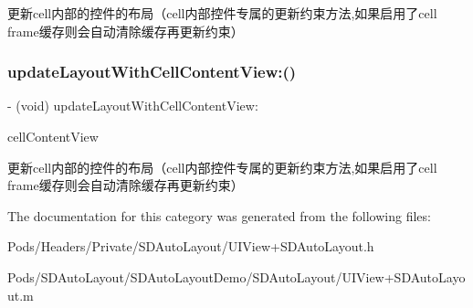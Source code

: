 更新cell内部的控件的布局（cell内部控件专属的更新约束方法,如果启用了cell frame缓存则会自动清除缓存再更新约束） \mbox{\label{category_u_i_view_07_s_d_auto_height_width_08_ad0e71cc33b6b6cb7ad65236d0a8e5df9}} 
\subsubsection{\texorpdfstring{update\+Layout\+With\+Cell\+Content\+View\+:()}{updateLayoutWithCellContentView:()}\hspace{0.1cm}{\footnotesize\ttfamily [3/3]}}
{\footnotesize\ttfamily -\/ (void) update\+Layout\+With\+Cell\+Content\+View\+: \begin{DoxyParamCaption}\item[{(U\+I\+View $\ast$)}]{cell\+Content\+View }\end{DoxyParamCaption}}

更新cell内部的控件的布局（cell内部控件专属的更新约束方法,如果启用了cell frame缓存则会自动清除缓存再更新约束） 

The documentation for this category was generated from the following files\+:\begin{DoxyCompactItemize}
\item 
Pods/\+Headers/\+Private/\+S\+D\+Auto\+Layout/U\+I\+View+\+S\+D\+Auto\+Layout.\+h\item 
Pods/\+S\+D\+Auto\+Layout/\+S\+D\+Auto\+Layout\+Demo/\+S\+D\+Auto\+Layout/U\+I\+View+\+S\+D\+Auto\+Layout.\+m\end{DoxyCompactItemize}
